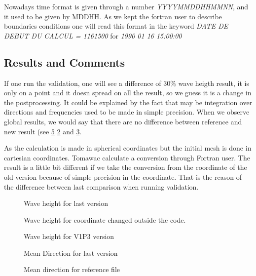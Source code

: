 Nowadays time format is given through a number \textit{YYYYMMDDHHMMNN}, and it used to be given by MDDHH. 
As we kept the fortran user to describe boundaries conditions one will read this format in the keyword \textit{DATE DE DEBUT DU CALCUL = 1161500} for \textit{1990 01 16 15:00:00}

\subsection{Results and Comments}

If one run the validation, one will see a difference of 30\% wave heigth result, it is only on a point and it doesn spread on all the result, so we guess it is a change in the postprocessing. It could be explained by the fact that may be integration over directions and frequencies used to be made in simple precision.
When we observe global results, we would say that there are no difference between reference and new result (see \ref{figmanchehm0} \ref{figmanchehm02} and \ref{figmanchehm0v1P3}.

As the calculation is made in spherical coordinates but the initial mesh is done in cartesian coordinates. Tomawac calculate a conversion through Fortran user. The result is a little bit different if we take the conversion from the coordinate of the old version because of simple precision in the coordinate. That is the reason of the difference between last comparison when running validation.  

\begin{figure} [!h]
\centering
{}
 \caption{Wave height for last version}
\label{figmanchehm0}
\end{figure}
\begin{figure} [!h]
\centering
{}
 \caption{Wave height for coordinate changed outside the code.}
\label{figmanchehm02}
\end{figure}
\begin{figure} [!h]
\centering
{}
 \caption{Wave height for V1P3 version}
\label{figmanchehm0v1P3}
\end{figure}
\begin{figure} [!h]
\centering
{}
 \caption{Mean Direction for last version}
\label{figmanchedirection}
\end{figure}
\begin{figure} [!h]
\centering
{}
 \caption{Mean direction for reference file}
\label{figmanchehm0}
\end{figure}
